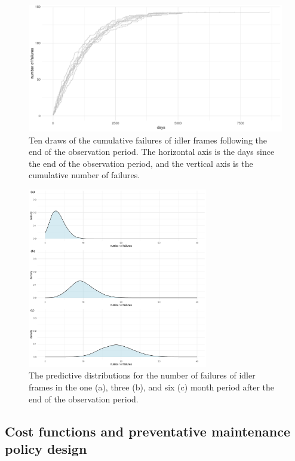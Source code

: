 \begin{figure}[t]
  \centering
  \includegraphics[width=1\textwidth]{./figures/ch-3/E-n-failures-draws.pdf}
  \caption{Ten draws of the cumulative failures of idler frames following the end of the observation period. The horizontal axis is the days since the end of the observation period, and the vertical axis is the cumulative number of failures.}
  \label{fig:E-Nfailrues-draws}
\end{figure}

\begin{figure}[t]
  \centering
  \includegraphics[width=0.7\textwidth]{./figures/ch-3/E-n-failures-densities.pdf}
  \caption{The predictive distributions for the number of failures of idler frames in the one (a), three (b), and six (c) month period after the end of the observation period.}
  \label{fig:E-Nfailrues-densities}
\end{figure}

\subsection{Cost functions and preventative maintenance policy design} \label{subsec:idler-cost-function}

